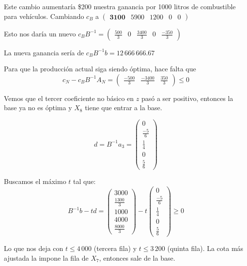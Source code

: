 \documentclass[10pt,a4paper]{article}
\begin{document}
\vspace{5mm}

Este cambio aumentaría \$200 nuestra ganancia por 1000 litros de combustible para vehículos. Cambiando $c_B$ a $\begin{pmatrix} \textbf{3100} & 5900 & 1200 & 0 & 0\end{pmatrix}$

Esto nos daría un nuevo $c_B B^{-1} = \begin{pmatrix} \frac{500}{3} & 0 & \frac{3400}{3} & 0 & \frac{-350}{3} \end{pmatrix}$

La nueva ganancia sería de $c_B B^{-1} b = 12\,666\,666.67$

Para que la producción actual siga siendo óptima, hace falta que
\[
	c_N - c_B B^{-1} A_N = \begin{pmatrix} \frac{-500}{3} & \frac{-3400}{3} & \frac{350}{3} \end{pmatrix} \leq 0
\]

Vemos que el tercer coeficiente no básico en $z$ pasó a ser positivo, entonces la base ya no es óptima y $X_8$ tiene que entrar a la base.

\[
	d = B^{-1}a_3 = \begin{pmatrix} 0 \\ \frac{-5}{6} \\ \frac{1}{4} \\ 0 \\ \frac{5}{6} \end{pmatrix}
\]

Buscamos el máximo $t$ tal que:
\[
	B^{-1}b - td =
	\begin{pmatrix}
		3000 \\
		\frac{1300}{3} \\
		1000 \\
		4000 \\
		\frac{8000}{3}
	\end{pmatrix}
	- t
	\begin{pmatrix} 0 \\
		\frac{-5}{6} \\
		\frac{1}{4} \\
		0 \\
		\frac{5}{6}
	\end{pmatrix}
	\geq 0
\]

Lo que nos deja con $t \leq 4\,000$ (tercera fila) y $t \leq 3\,200$ (quinta fila). La cota más ajustada la impone la fila de $X_7$, entonces sale de la base.
\end{document}
